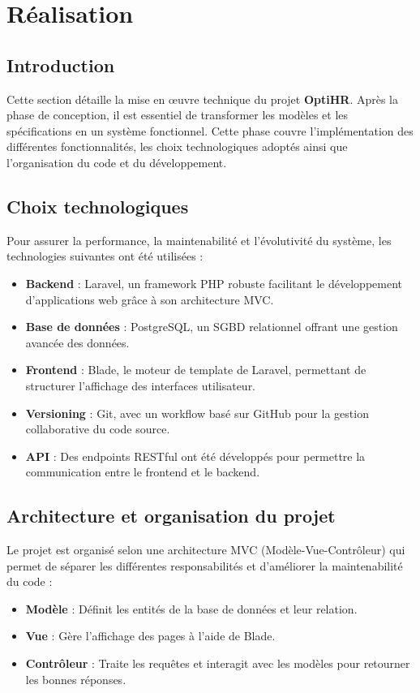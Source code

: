 \chapter{Réalisation}
\clearpage
\section{Introduction}
Cette section détaille la mise en œuvre technique du projet \textbf{OptiHR}. Après la phase de conception, il est essentiel de transformer les modèles et les spécifications en un système fonctionnel. Cette phase couvre l'implémentation des différentes fonctionnalités, les choix technologiques adoptés ainsi que l'organisation du code et du développement.

\section{Choix technologiques}
Pour assurer la performance, la maintenabilité et l’évolutivité du système, les technologies suivantes ont été utilisées :
\begin{itemize}
    \item \textbf{Backend} : Laravel, un framework PHP robuste facilitant le développement d’applications web grâce à son architecture MVC.
    \item \textbf{Base de données} : PostgreSQL, un SGBD relationnel offrant une gestion avancée des données.
    \item \textbf{Frontend} : Blade, le moteur de template de Laravel, permettant de structurer l'affichage des interfaces utilisateur.
    \item \textbf{Versioning} : Git, avec un workflow basé sur GitHub pour la gestion collaborative du code source.
    \item \textbf{API} : Des endpoints RESTful ont été développés pour permettre la communication entre le frontend et le backend.
\end{itemize}

\section{Architecture et organisation du projet}
Le projet est organisé selon une architecture MVC (Modèle-Vue-Contrôleur) qui permet de séparer les différentes responsabilités et d'améliorer la maintenabilité du code :
\begin{itemize}
    \item \textbf{Modèle} : Définit les entités de la base de données et leur relation.
    \item \textbf{Vue} : Gère l’affichage des pages à l’aide de Blade.
    \item \textbf{Contrôleur} : Traite les requêtes et interagit avec les modèles pour retourner les bonnes réponses.
\end{itemize}

